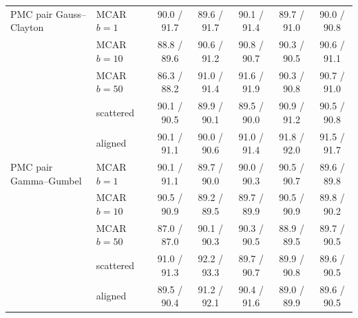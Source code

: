 \begin{table}[htbp]
\begin{tabular}{llccccc}
    \addlinespace
    PMC pair Gauss--Clayton & MCAR $b{=}1$ & 90.0 / 91.7 & 89.6 / 91.7 & 90.1 / 91.4 & 89.7 / 91.0 & 90.0 / 90.8 \\
     & MCAR $b{=}10$ & 88.8 / 89.6 & 90.6 / 91.2 & 90.8 / 90.7 & 90.3 / 90.5 & 90.6 / 91.1 \\
     & MCAR $b{=}50$ & 86.3 / 88.2 & 91.0 / 91.4 & 91.6 / 91.9 & 90.3 / 90.8 & 90.7 / 91.0 \\
     & scattered & 90.1 / 90.5 & 89.9 / 90.1 & 89.5 / 90.0 & 90.9 / 91.2 & 90.5 / 90.8 \\
     & aligned & 90.1 / 91.1 & 90.0 / 90.6 & 91.0 / 91.4 & 91.8 / 92.0 & 91.5 / 91.7 \\
    \addlinespace
    PMC pair Gamma--Gumbel & MCAR $b{=}1$ & 90.1 / 91.1 & 89.7 / 90.0 & 90.0 / 90.3 & 90.5 / 90.7 & 89.6 / 89.8 \\
     & MCAR $b{=}10$ & 90.5 / 90.9 & 89.2 / 89.5 & 89.7 / 89.9 & 90.5 / 90.9 & 89.8 / 90.2 \\
     & MCAR $b{=}50$ & 87.0 / 87.0 & 90.1 / 90.3 & 90.3 / 90.5 & 88.9 / 89.5 & 89.7 / 90.5 \\
     & scattered & 91.0 / 91.3 & 92.2 / 93.3 & 89.7 / 90.7 & 89.9 / 90.8 & 89.6 / 90.5 \\
     & aligned & 89.5 / 90.4 & 91.2 / 92.1 & 90.4 / 91.6 & 89.0 / 89.9 & 89.6 / 90.5 \\
    \bottomrule
  \end{tabular}
\end{table}
